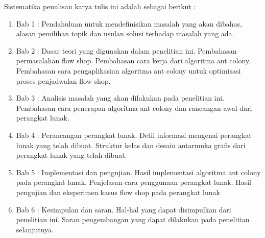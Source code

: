 Sistematika penulisan karya tulis ini adalah sebagai berikut :

\begin{enumerate}
	\item Bab 1 : Pendahuluan untuk mendefinisikan masalah yang akan dibahas, alasan pemilihan
	topik dan usulan solusi terhadap masalah yang ada.
	
	\item Bab 2 : Dasar teori yang digunakan dalam penelitian ini. Pembahasan permasalahan 
	flow shop. Pembahasan cara kerja dari algoritma ant colony. Pembahasan cara pengaplikasian
	algoritma ant colony untuk optimisasi proses penjadwalan flow shop.
	
	\item Bab 3 : Analisis masalah yang akan dilakukan pada penelitian ini. Pembahasan cara penerapan
	algoritma ant colony dan rancangan awal dari perangkat lunak.
	
	\item Bab 4 : Perancangan perangkat lunak. Detil informasi mengenai perangkat lunak yang telah
	dibuat. Struktur kelas dan desain antarmuka grafis dari perangkat lunak yang telah dibuat.
	
	\item Bab 5 : Implementasi dan pengujian. Hasil implementasi algoritma ant colony pada perangkat
	lunak. Penjelasan cara penggunaan perangkat lunak. Hasil pengujian dan eksperimen kasus
	flow shop pada perangkat lunak
	
	\item Bab 6 : Kesimpulan dan saran. Hal-hal yang dapat disimpulkan dari penelitian ini. Saran
	pengembangan yang dapat dilakukan pada penelitian selanjutnya.
	
	
	
	
	
	
	
\end{enumerate}



